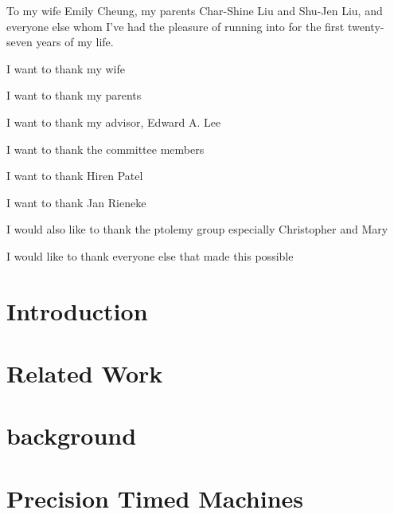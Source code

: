 \documentclass[11pt]{ucthesis}
\begin{document}
\begin{frontmatter}

\begin{dedication}
\null\vfil
{\large
\begin{center}
To my wife Emily Cheung, my parents Char-Shine Liu and Shu-Jen Liu, and everyone else whom
I've had the pleasure of running into for the first twenty-seven years of my
life.
\end{center}}
\vfil\null
\end{dedication}

\tableofcontents
\listoffigures
\listoftables
\begin{acknowledgements}

I want to thank my wife

I want to thank my parents

I want to thank my advisor, Edward A. Lee

I want to thank the committee members

I want to thank Hiren Patel

I want to thank Jan Rieneke

I would also like to thank the ptolemy group especially Christopher and Mary

I would like to thank everyone else that made this possible

\end{acknowledgements}

\end{frontmatter}

\chapter{Introduction}
\label{chapter:intro}


\chapter{Related Work}
\label{chapter:related}


\chapter{background}
\label{chapter:background}


\chapter{Precision Timed Machines}
\label{chapter:pret}

\end{document}
